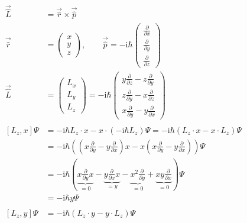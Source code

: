     \begin{align*}
        \vec{\hat{L}} &= \vec{\hat{r}} \times \vec{\hat{p}}\\
        \vec{\hat{r}} &= 
        \begin{pmatrix}
            x\\
            y\\
            z
        \end{pmatrix},
        \qquad \vec{\hat{p}} = -\text{i}\hbar
        \begin{pmatrix}
            \frac{\partial}{\partial x}\\
            \frac{\partial}{\partial y}\\
            \frac{\partial}{\partial z}
        \end{pmatrix}\\
        \vec{\hat{L}} &= 
        \begin{pmatrix}
            L_x\\
            L_y\\
            L_z
        \end{pmatrix}
        = 
        -\text{i}\hbar
        \begin{pmatrix}
            y\frac{\partial}{\partial z} - z\frac{\partial}{\partial y}\\
            z\frac{\partial}{\partial y} - x\frac{\partial}{\partial z}\\
            x\frac{\partial}{\partial y} - y\frac{\partial}{\partial x}
        \end{pmatrix}\\
        \\
        \left[ L_z,x \right]\Psi &= -\text{i}\hbar L_z\cdot x - x \cdot \left( -\text{i}\hbar L_z \right)\Psi = -\text{i}\hbar \left( L_z\cdot x - x \cdot L_z \right)\Psi\\
        &= -\text{i}\hbar \left( \left( x\frac{\partial}{\partial y} - y\frac{\partial}{\partial x} \right)x - x \left( x\frac{\partial}{\partial y} - y\frac{\partial}{\partial x} \right) \right)\Psi\\
        &= -\text{i}\hbar \left( \underbrace{x\frac{\partial}{\partial y}x}_{=0} - \underbrace{y\frac{\partial}{\partial x}x}_{=y} - \underbrace{x^2\frac{\partial}{\partial y}}_{=0} + \underbrace{xy\frac{\partial}{\partial x}}_{=0} \right)\Psi\\
        &= -\text{i}\hbar y\Psi\\
        \\
        \left[ L_z,y \right]\Psi &= -\text{i}\hbar \left( L_z\cdot y - y \cdot L_z \right) \Psi\\

\end{align*}
